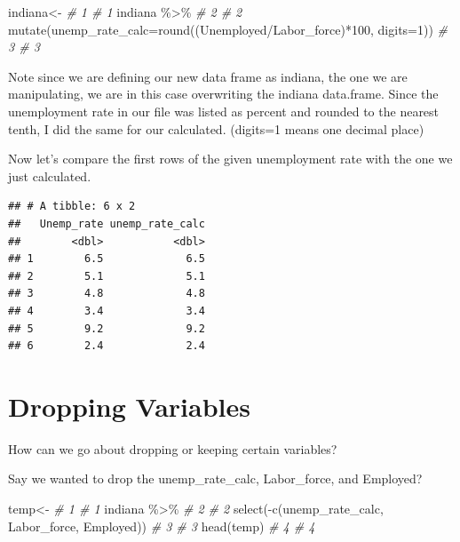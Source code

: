 \documentclass[
]{book}
\newenvironment{Shaded}{\begin{snugshade}}{\end{snugshade}}
\newcommand{\AttributeTok}[1]{\textcolor[rgb]{0.77,0.63,0.00}{#1}}
\newcommand{\CommentTok}[1]{\textcolor[rgb]{0.56,0.35,0.01}{\textit{#1}}}
\newcommand{\DecValTok}[1]{\textcolor[rgb]{0.00,0.00,0.81}{#1}}
\newcommand{\FunctionTok}[1]{\textcolor[rgb]{0.00,0.00,0.00}{#1}}
\newcommand{\NormalTok}[1]{#1}
\newcommand{\OtherTok}[1]{\textcolor[rgb]{0.56,0.35,0.01}{#1}}
\newcommand{\SpecialCharTok}[1]{\textcolor[rgb]{0.00,0.00,0.00}{#1}}
\begin{document}
\begin{Shaded}
\begin{Highlighting}[]
\NormalTok{indiana}\OtherTok{\textless{}{-}}                                                                \CommentTok{\# 1  \# 1}
\NormalTok{  indiana }\SpecialCharTok{\%\textgreater{}\%}                                                            \CommentTok{\# 2  \# 2}
  \FunctionTok{mutate}\NormalTok{(}\AttributeTok{unemp\_rate\_calc=}\FunctionTok{round}\NormalTok{((Unemployed}\SpecialCharTok{/}\NormalTok{Labor\_force)}\SpecialCharTok{*}\DecValTok{100}\NormalTok{, }\AttributeTok{digits=}\DecValTok{1}\NormalTok{))  }\CommentTok{\# 3  \# 3}
\end{Highlighting}
\end{Shaded}

Note since we are defining our new data frame as indiana, the one we are manipulating, we are in this case overwriting the indiana data.frame. Since the unemployment rate in our file was listed as percent and rounded to the nearest tenth, I did the same for our calculated. (digits=1 means one decimal place)

Now let's compare the first rows of the given unemployment rate with the one we just calculated.

\begin{verbatim}
## # A tibble: 6 x 2
##   Unemp_rate unemp_rate_calc
##        <dbl>           <dbl>
## 1        6.5             6.5
## 2        5.1             5.1
## 3        4.8             4.8
## 4        3.4             3.4
## 5        9.2             9.2
## 6        2.4             2.4
\end{verbatim}

\hypertarget{dropping-variables}{%
\section{Dropping Variables}\label{dropping-variables}}

How can we go about dropping or keeping certain variables?

Say we wanted to drop the unemp\_rate\_calc, Labor\_force, and Employed?

\begin{Shaded}
\begin{Highlighting}[]
\NormalTok{temp}\OtherTok{\textless{}{-}}                                                 \CommentTok{\# 1  \# 1}
\NormalTok{  indiana }\SpecialCharTok{\%\textgreater{}\%}                                          \CommentTok{\# 2  \# 2}
  \FunctionTok{select}\NormalTok{(}\SpecialCharTok{{-}}\FunctionTok{c}\NormalTok{(unemp\_rate\_calc, Labor\_force,  Employed))  }\CommentTok{\# 3  \# 3}
\FunctionTok{head}\NormalTok{(temp)                                             }\CommentTok{\# 4  \# 4}
\end{Highlighting}
\end{Shaded}
\end{document}
